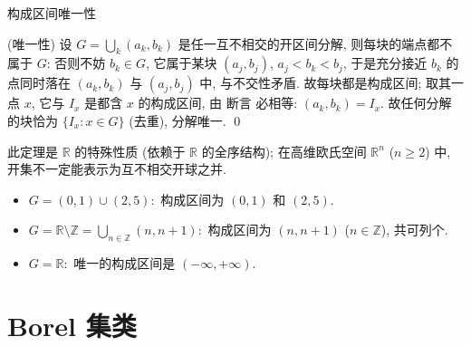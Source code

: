 \begin{frame}{构成区间唯一性}

\startproof[bg=yellow, fg=red](唯一性)
设 $G = \bigcup_k (a_k, b_k)$ 是任一互不相交的开区间分解, 则每块的端点都不属于 $G$: 否则不妨 $b_k \in G$, 它属于某块 $(a_j, b_j)$, $a_j < b_k < b_j$, 于是充分接近 $b_k$ 的点同时落在 $(a_k, b_k)$ 与 $(a_j, b_j)$ 中, 与不交性矛盾. 故每块都是构成区间; 取其一点 $x$, 它与 $I_x$ 是都含 $x$ 的构成区间, 由 \alert{断言} 必相等: $(a_k, b_k) = I_x$. 故任何分解的块恰为 $\{I_x : x \in G\}$ (去重), 分解唯一.
\qed

\pause
\vspace{1em}

\begin{remark}
此定理是 $\mathbb{R}$ 的特殊性质 (依赖于 $\mathbb{R}$ 的全序结构); 在高维欧氏空间 $\mathbb{R}^n$ ($n \geqslant 2$) 中, 开集不一定能表示为互不相交开球之并.
\end{remark}

\pause

\begin{eg}
\begin{itemize}
\item $G = (0, 1) \cup (2, 5):$ 构成区间为 $(0, 1)$ 和 $(2, 5).$
\item $G = \mathbb{R} \setminus \mathbb{Z} = \bigcup_{n \in \mathbb{Z}} (n, n+1):$ 构成区间为 $(n, n+1)$ ($n \in \mathbb{Z}$), 共可列个.
\item $G = \mathbb{R}:$ 唯一的构成区间是 $(-\infty, +\infty).$
\end{itemize}
\end{eg}

\end{frame}


\section[Borel 集]{Borel 集类}


